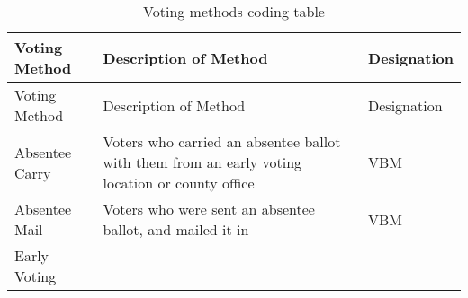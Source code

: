 \documentclass[]{article}
\begin{document}
\begin{longtable}[]{@{}lll@{}}
\caption{Voting methods coding table
\label{tab:voting_methods_table}}\tabularnewline
\toprule
\begin{minipage}[b]{0.22\columnwidth}\raggedright\strut
Voting Method\strut
\end{minipage} & \begin{minipage}[b]{0.42\columnwidth}\raggedright\strut
Description of Method\strut
\end{minipage} & \begin{minipage}[b]{0.18\columnwidth}\raggedright\strut
Designation\strut
\end{minipage}\tabularnewline
\midrule
\endfirsthead
\toprule
\begin{minipage}[b]{0.22\columnwidth}\raggedright\strut
Voting Method\strut
\end{minipage} & \begin{minipage}[b]{0.42\columnwidth}\raggedright\strut
Description of Method\strut
\end{minipage} & \begin{minipage}[b]{0.18\columnwidth}\raggedright\strut
Designation\strut
\end{minipage}\tabularnewline
\midrule
\endhead
\begin{minipage}[t]{0.22\columnwidth}\raggedright\strut
Absentee Carry\strut
\end{minipage} & \begin{minipage}[t]{0.42\columnwidth}\raggedright\strut
Voters who carried an absentee ballot with them from an early voting
location or county office\strut
\end{minipage} & \begin{minipage}[t]{0.18\columnwidth}\raggedright\strut
VBM\strut
\end{minipage}\tabularnewline
\begin{minipage}[t]{0.22\columnwidth}\raggedright\strut
Absentee Mail\strut
\end{minipage} & \begin{minipage}[t]{0.42\columnwidth}\raggedright\strut
Voters who were sent an absentee ballot, and mailed it in\strut
\end{minipage} & \begin{minipage}[t]{0.18\columnwidth}\raggedright\strut
VBM\strut
\end{minipage}\tabularnewline
\begin{minipage}[t]{0.22\columnwidth}\raggedright\strut
Early Voting\strut
\end{minipage} & \begin{minipage}[t]{0.42\columnwidth}\raggedright\strut

\end{minipage}
\end{longtable}
\end{document}
